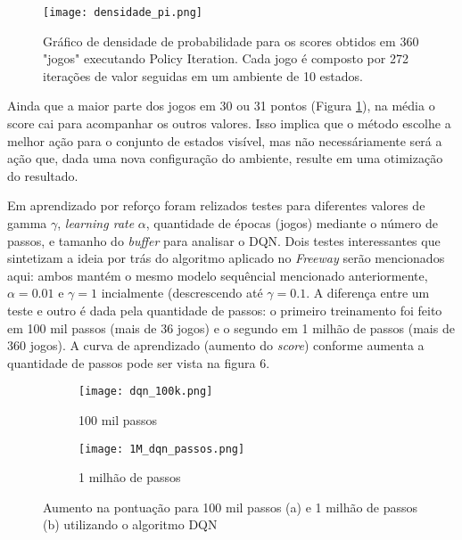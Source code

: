 \documentclass[letterpaper]{article} %
\begin{document}
\begin{figure}[h]
	\center
	\texttt{[image: densidade\_pi.png]}
    \caption{Gráfico de densidade de probabilidade para os scores obtidos em 360 "jogos" executando Policy Iteration. Cada jogo é composto por 272 iterações de valor seguidas em um ambiente de 10 estados.}
    \label{fig:densidade_pi}
\end{figure}

Ainda que a maior parte dos jogos em 30 ou 31 pontos (Figura \ref{fig:densidade_pi}), na média o score cai para acompanhar os outros valores. Isso implica que o método escolhe a melhor ação para o conjunto de estados visível, mas não necessáriamente será a ação que, dada uma nova configuração do ambiente, resulte em uma otimização do resultado.

Em aprendizado por reforço foram relizados testes para diferentes valores de gamma $\gamma$, \textit{learning rate} $\alpha$, quantidade de épocas (jogos) mediante o número de passos, e tamanho do \textit{buffer} para analisar o DQN. Dois testes interessantes que sintetizam a ideia por trás do algoritmo aplicado no \textit{Freeway} serão mencionados aqui: ambos mantém o mesmo modelo sequêncial mencionado anteriormente, $\alpha = 0.01$ e $\gamma = 1$ incialmente (descrescendo até $\gamma = 0.1$. A diferença entre um teste e outro é dada pela quantidade de passos: o primeiro treinamento foi feito em 100 mil passos (mais de 36 jogos) e o segundo em 1 milhão de passos (mais de 360 jogos). A curva de aprendizado (aumento do \textit{score}) conforme aumenta a quantidade de passos pode ser vista na figura 6.

\begin{figure}[!h]
     \begin{subfigure}[h]{0.37\textwidth}
  	     \hspace{0.8cm}
         \texttt{[image: dqn\_100k.png]}
         \caption{100 mil passos}
     \end{subfigure}
     \hfill
     \begin{subfigure}[h]{0.37\textwidth}
	     \hspace{0.8cm}
         \texttt{[image: 1M\_dqn\_passos.png]}
         \caption{1 milhão de passos}
     \end{subfigure}
        \caption{Aumento na pontuação para 100 mil passos (a) e 1 milhão de passos (b) utilizando o algoritmo DQN}
\end{figure}
\end{document}
